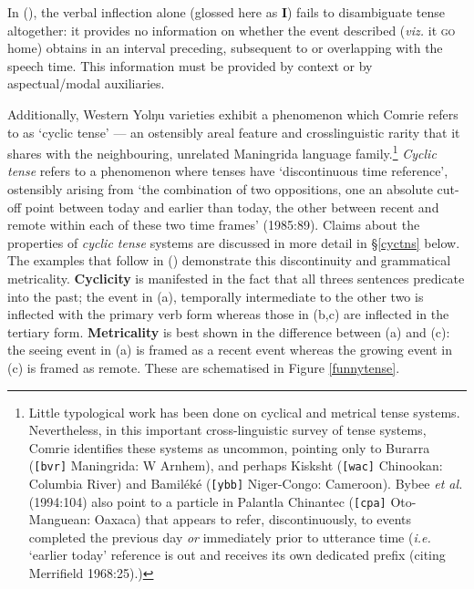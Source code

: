 \documentclass[12pt]{article}
\begin{document}
In (\lastx), the verbal inflection alone (glossed here as \textbf{I}) fails to disambiguate tense altogether: it provides no information on whether the event described (\textit{viz.} it \textsc{go} home) obtains in an interval preceding, subsequent to or overlapping with the speech time. This information must be provided by context or by aspectual/modal auxiliaries.

Additionally, Western Yolŋu varieties exhibit a phenomenon which Comrie refers to as `cyclic tense' --- an ostensibly areal feature and crosslinguistic rarity that it shares with the neighbouring, unrelated Maningrida language family.\footnote{Little typological work has been done on cyclical and metrical tense systems. Nevertheless, in this important cross-linguistic survey of tense systems, Comrie identifies these systems as uncommon, pointing only to Burarra (\texttt{[bvr]} Maningrida: W Arnhem), and perhaps Kisksht (\texttt{[wac]} Chinookan: Columbia River) and Bamiléké (\texttt{[ybb]} Niger-Congo: Cameroon). Bybee \textit{et al.} (1994:104) also point to a particle in Palantla Chinantec (\texttt{[cpa]} Oto-Manguean: Oaxaca) that appears to refer, discontinuously, to events completed the previous day \textit{or} immediately prior to utterance time (\textit{i.e.} `earlier today' reference is out and receives its own dedicated prefix (citing Merrifield 1968:25).)}
\textit{Cyclic tense} refers to a phenomenon where tenses have `discontinuous time reference', ostensibly arising from `the combination of two oppositions, one an absolute cut-off point between today and earlier than today, the other between recent and remote within each of these two time frames' (1985:89). Claims about the properties of \textit{cyclic tense} systems are discussed in more detail in §\ref{cyctns} below. The examples that follow in (\nextx) demonstrate this discontinuity and grammatical metricality. \textbf{Cyclicity} is manifested in the fact that all threes sentences predicate into the past; the event in (a), temporally intermediate to the other two is inflected with the primary verb form whereas those in (b,c) are inflected in the tertiary form. \textbf{Metricality} is best shown in the difference between (a) and (c): the seeing event in (a) is framed as a recent event whereas the growing event in (c) is framed as remote. These are schematised in Figure \ref{funnytense}.
\end{document}
